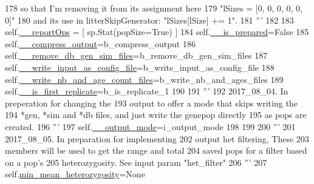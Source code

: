 \begin{DoxyCode}
178 \textcolor{stringliteral}{        so that I'm removing it from its assignment here }
179 \textcolor{stringliteral}{        "lSizes = [0, 0, 0, 0, 0, 0]"}
180 \textcolor{stringliteral}{        and its use in litterSkipGenerator: "lSizes[lSize] += 1".}
181 \textcolor{stringliteral}{        '''}
182 
183         self.\hyperlink{classnegui_1_1pgopsimupop_1_1PGOpSimuPop_a1224d81cfdf1400b2f12970074c81817}{\_\_reportOps} = [ sp.Stat(popSize=\textcolor{keyword}{True}) ]
184         self.\hyperlink{classnegui_1_1pgopsimupop_1_1PGOpSimuPop_ac10f21f990f51e85c7fab2b5aa888edd}{\_\_is\_prepared}=\textcolor{keyword}{False}
185         self.\hyperlink{classnegui_1_1pgopsimupop_1_1PGOpSimuPop_acccf36393e66057c8026cba0557d3fb8}{\_\_compress\_output}=b\_compress\_output
186         self.\hyperlink{classnegui_1_1pgopsimupop_1_1PGOpSimuPop_a5a64b272404e6113dd1c7ba70235c366}{\_\_remove\_db\_gen\_sim\_files}=b\_remove\_db\_gen\_sim\_files
187         self.\hyperlink{classnegui_1_1pgopsimupop_1_1PGOpSimuPop_a9a27655cf00df0e11603e221c314c0a9}{\_\_write\_input\_as\_config\_file}=b\_write\_input\_as\_config\_file
188         self.\hyperlink{classnegui_1_1pgopsimupop_1_1PGOpSimuPop_a55c874d7c0586a2d73f77390ff07e443}{\_\_write\_nb\_and\_age\_count\_files}=b\_write\_nb\_and\_ages\_files
189         self.\hyperlink{classnegui_1_1pgopsimupop_1_1PGOpSimuPop_af0f7b886dbd5087c1b4d64b80ec3ae2a}{\_\_is\_first\_replicate}=b\_is\_replicate\_1
190         
191         \textcolor{stringliteral}{'''}
192 \textcolor{stringliteral}{        2017\_08\_04.  In preperation for changing the }
193 \textcolor{stringliteral}{        output to offer a mode that skips  writing the }
194 \textcolor{stringliteral}{        *gen, *sim and *db files, and just write the genepop directly}
195 \textcolor{stringliteral}{        as pops are created.}
196 \textcolor{stringliteral}{        '''}
197         self.\hyperlink{classnegui_1_1pgopsimupop_1_1PGOpSimuPop_abac5c621286b240967702ca9cd23dddf}{\_\_output\_mode}=i\_output\_mode
198 
199 
200         \textcolor{stringliteral}{'''}
201 \textcolor{stringliteral}{        2017\_08\_05.  In preparation for implementing}
202 \textcolor{stringliteral}{        output het filtering,  These}
203 \textcolor{stringliteral}{        members will be used to get the range and total}
204 \textcolor{stringliteral}{        saved pops for a filter based on a pop's }
205 \textcolor{stringliteral}{        heterozygosity.  See input param "het\_filter"}
206 \textcolor{stringliteral}{        '''}
207         self.\hyperlink{classnegui_1_1pgopsimupop_1_1PGOpSimuPop_a3565bd942f65c37e383cfe66e4c55e33}{min\_mean\_heterozygosity}=\textcolor{keywordtype}{None}

\end{DoxyCode}
